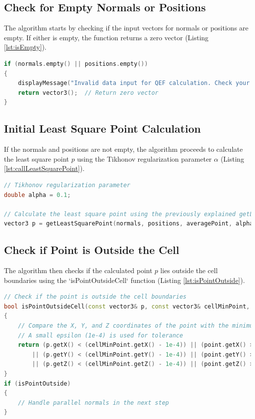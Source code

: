 \subsection{Check for Empty Normals or Positions}
The algorithm starts by checking if the input vectors for normals or positions are empty. If either is empty, the function returns a zero vector (Listing \ref{lst:isEmpty}).

\vspace{2mm}
\begin{lstlisting}[language=C++, caption=Checking for empty normals or positions, label=lst:isEmpty]
if (normals.empty() || positions.empty())
{
    displayMessage("Invalid data input for QEF calculation. Check your data.\n\n");
    return vector3();  // Return zero vector
}
\end{lstlisting}

\subsection{Initial Least Square Point Calculation}
If the normals and positions are not empty, the algorithm proceeds to calculate the least square point \( p \) using the Tikhonov regularization parameter \( \alpha \) (Listing \ref{lst:callLeastSquarePoint}).

\vspace{2mm}
\begin{lstlisting}[language=C++, caption=Initial least square point calculation, label=lst:callLeastSquarePoint]
// Tikhonov regularization parameter
double alpha = 0.1;

// Calculate the least square point using the previously explained getLeastSquarePoint function (See Listing 5.1)
vector3 p = getLeastSquarePoint(normals, positions, averagePoint, alpha);
\end{lstlisting}

\subsection{Check if Point is Outside the Cell}
The algorithm then checks if the calculated point \( p \) lies outside the cell boundaries using the `isPointOutsideCell` function (Listing \ref{lst:isPointOutside}).

\vspace{2mm}
\begin{lstlisting}[language=C++, caption=Checking if point is outside the cell, label=lst:isPointOutside]
// Check if the point is outside the cell boundaries
bool isPointOutsideCell(const vector3& p, const vector3& cellMinPoint, const vector3& cellMaxPoint)
{
    // Compare the X, Y, and Z coordinates of the point with the minimum and maximum coordinates of the cell
    // A small epsilon (1e-4) is used for tolerance
    return (p.getX() < (cellMinPoint.getX() - 1e-4)) || (point.getX() > (cellMaxPoint.getX() + 1e-4))
        || (p.getY() < (cellMinPoint.getY() - 1e-4)) || (point.getY() > (cellMaxPoint.getY() + 1e-4))
        || (p.getZ() < (cellMinPoint.getZ() - 1e-4)) || (point.getZ() > (cellMaxPoint.getZ() + 1e-4));
}
if (isPointOutside)
{
    // Handle parallel normals in the next step
}
\end{lstlisting}

